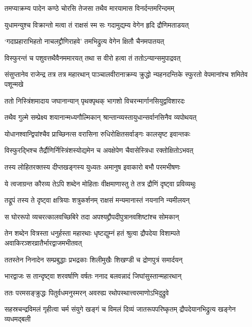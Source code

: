 \twolineshloka
{तमप्याक्रम्य पादेन कण्ठे चोरसि तेजसा}
{तथैव मारयामास विनर्दन्तमरिन्दमम्}


\twolineshloka
{युधामन्युश्च विक्रान्तो मत्वा तं राक्षसं स्म सः}
{गदामुद्यम्य वेगेन हृदि द्रौणिमताडयत्}


\twolineshloka
{`गदाप्रहाराभिहतो नाचलद्द्रौणिराहवे'}
{तमभिद्रुत्य वेगेन क्षितौ चैनमपातयत्}


\twolineshloka
{विस्फुरन्तं च पशुवत्तथैवैनममारयत्}
{तथा स वीरो हत्वा तं ततोऽन्यान्समुपाद्रवत्}


\threelineshloka
{संसुप्तानेव राजेन्द्र तत्र तत्र महारथान्}
{पाञ्चालवीरानाक्रम्य क्रुद्धो न्यहनदन्तिके}
{स्फुरतो वेपमानांश्च शमितेव पशून्मखे}


\twolineshloka
{ततो निस्त्रिंशमादाय जघानान्यान् पृथक्पृथक्}
{भागशो विचरन्मार्गानसियुद्वविशारदः}


\twolineshloka
{तथैव गुल्मे सम्प्रेक्ष्य शयानान्मध्यगौल्मिकान्}
{श्रान्तान्व्यस्तायुधान्सर्वानसिनैव व्यपोथयत्}


\twolineshloka
{योधानश्वान्द्विपांश्चैव प्राच्छिनत्स वरासिना}
{रुधिरोक्षितसर्वाङ्गः कालसृष्ट इवान्तकः}


\twolineshloka
{विस्फुरद्भिश्च तैर्द्रौणिर्निस्त्रिंशस्योद्यमेन च}
{अवक्षेपेण चैवासेस्त्रिधा रक्तोक्षितोऽभवत्}


\twolineshloka
{तस्य लोहितरक्तस्य दीप्तखङ्गस्य युध्यतः}
{अमानुष इवाकारो बभौ परमभीषणः}


\twolineshloka
{ये त्वजाग्रन्त कौरव्य तेऽपि शब्देन मोहिताः}
{वीक्षमाणास्तु ते तत्र द्रौणिं दृष्ट्वा प्रविव्यथुः}


\twolineshloka
{तद्रूपं तस्य ते दृष्ट्वा क्षत्रियाः शत्रुकर्शनम्}
{राक्षसं मन्यमानास्तं नयनानि न्यमीलयन्}


\twolineshloka
{स घोररूपो व्यचरत्कालवच्छिबिरे तदा}
{अपश्यद्द्रौपदीपुत्रानवशिष्टांश्च सोमकान्}


\threelineshloka
{तेन शब्देन वित्रस्ता धनुर्हस्ता महारथाः}
{धृष्टद्युम्नं हतं श्रुत्वा द्रौपदेया विशाम्पते}
{अवाकिरञ्शरव्रातैर्भारद्वाजमभीतवत्}


\twolineshloka
{ततस्तेन निनादेन सम्प्रबुद्धाः प्रभद्रकाः}
{शिलीमुखैः शिखण्डी च द्रोणपुत्रं समार्दयन्}


\twolineshloka
{भारद्वाजः स तान्दृष्ट्वा शरवर्षाणि वर्षतः}
{ननाद बलवन्नादं जिघांसुस्तान्महारथान्}


\twolineshloka
{ततः परमसङ्क्रुद्धः पितुर्वधमनुस्मरन्}
{अवरुह्य रथोपस्थात्त्वरमाणोऽभिदुद्रुवे}


\threelineshloka
{सहस्रचन्द्रविमलं गृहीत्वा चर्म संयुगे}
{खङ्गं च विमलं दिव्यं जातरूपपरिष्कृतम्}
{द्रौपदेयानभिद्रुत्य खङ्गेन व्यधमद्बली}


